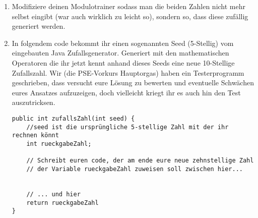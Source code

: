 \documentclass{../../sheet}
\begin{document}
\begin{enumerate}
    \item Modifiziere deinen Modulotrainer sodass man die beiden Zahlen nicht mehr selbst eingibt (war auch wirklich zu leicht so), sondern so, dass diese zufällig generiert werden. 
    \item In folgendem code bekommt ihr einen sogenannten Seed (5-Stellig) vom eingebauten Java Zufallsgenerator. Generiert mit den mathematischen Operatoren die ihr jetzt kennt anhand dieses Seeds eine neue 10-Stellige Zufallszahl. Wir (die PSE-Vorkurs Hauptorgas) haben ein Testerprogramm geschrieben, dass versucht eure Lösung zu bewerten und eventuelle Schwächen eures Ansatzes aufzuzeigen, doch vielleicht kriegt ihr es auch hin den Test auszutricksen.
    
    \begin{verbatim}
public int zufallsZahl(int seed) {
    //seed ist die ursprüngliche 5-stellige Zahl mit der ihr rechnen könnt
    int rueckgabeZahl;

    // Schreibt euren code, der am ende eure neue zehnstellige Zahl
    // der Variable rueckgabeZahl zuweisen soll zwischen hier...


    // ... und hier
    return rueckgabeZahl
}
    \end{verbatim}
\end{enumerate}
\end{document}
